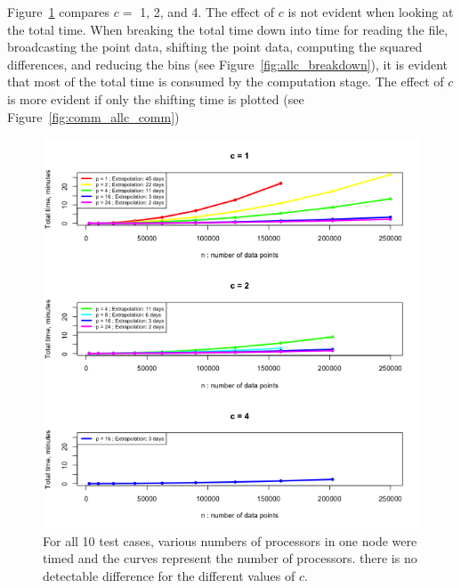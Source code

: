 Figure~\ref{fig:comm_allc_timings} compares $c=$ 1, 2, and 4. The effect of $c$ is not evident when looking at the total time. When breaking the total time down into time for reading the file, broadcasting the point data, shifting the point data, computing the squared differences, and reducing the bins (see Figure~\ref{fig:allc_breakdown}), it is evident that most of the total time is consumed by the computation stage. The effect of $c$ is more evident if only the shifting time is plotted (see Figure~\ref{fig:comm_allc_comm})

\begin{figure}[!h]
   \centering
   \includegraphics[width=\textwidth]{./fig/comm_allc_timings.png} %
   \caption{For all 10 test cases, various numbers of processors in one node were timed and the curves represent the number of processors. there is no detectable difference for the different values of $c$. }
   \label{fig:comm_allc_timings}
\end{figure}

